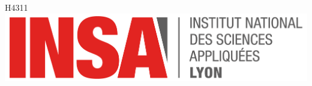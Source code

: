 \documentclass[12pt]{article}
\begin{document}
\begin{titlepage}
H4311\\[2cm]

\includegraphics[scale=0.3]{figures/logo.png}

\vfill %

\end{titlepage}
\end{document}
